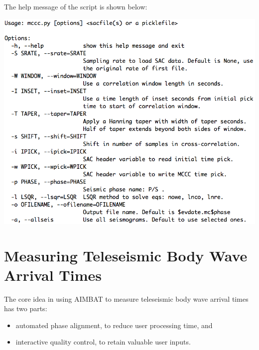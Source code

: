 \documentclass[letterpaper,10pt,english]{sphinxmanual}
\begin{document}
The help message of the  script is shown below:

\includegraphics{help-mccc.png}


\chapter{Measuring Teleseismic Body Wave Arrival Times}
\label{docfiles/PickingTravelTimes::doc}\label{docfiles/PickingTravelTimes:measuring-teleseismic-body-wave-arrival-times}
The core idea in using AIMBAT to measure teleseismic body wave arrival times has two parts:
\begin{itemize}
\item {} 
automated phase alignment, to reduce user processing time, and

\item {} 
interactive quality control, to retain valuable user inputs.

\end{itemize}
\end{document}
